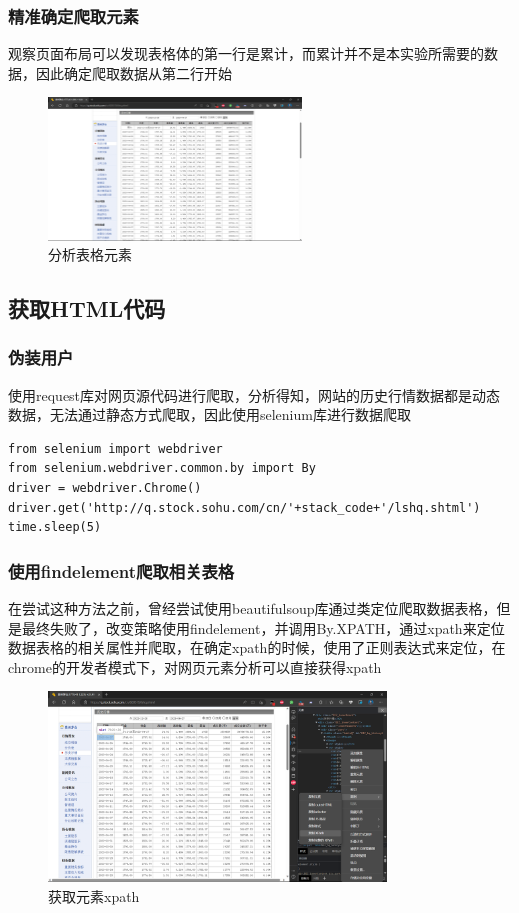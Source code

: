\documentclass[UTF8,12pt]{article}
\begin{document}
\newpage

\subsubsection{精准确定爬取元素}
观察页面布局可以发现表格体的第一行是累计，而累计并不是本实验所需要的数据，因此确定爬取数据从第二行开始

\begin{figure}[htbp]
    \centering
    \includegraphics[width=0.6\textwidth]{img/6.png}
    \caption{分析表格元素}
\end{figure}

\subsection{获取HTML代码}
\subsubsection{伪装用户}
使用request库对网页源代码进行爬取，分析得知，网站的历史行情数据都是动态数据，无法通过静态方式爬取，因此使用selenium库进行数据爬取

\begin{lstlisting}[title=调用selenium库, frame=shadowbox]
from selenium import webdriver
from selenium.webdriver.common.by import By
driver = webdriver.Chrome()
driver.get('http://q.stock.sohu.com/cn/'+stack_code+'/lshq.shtml')
time.sleep(5)
\end{lstlisting}

\subsubsection{使用findelement爬取相关表格}
在尝试这种方法之前，曾经尝试使用beautifulsoup库通过类定位爬取数据表格，但是最终失败了，改变策略使用findelement，并调用By.XPATH，通过xpath来定位数据表格的相关属性并爬取，在确定xpath的时候，使用了正则表达式来定位，在chrome的开发者模式下，对网页元素分析可以直接获得xpath
\begin{figure}[htbp]
    \centering
    \includegraphics[width=0.8\textwidth]{img/7.png}
    \caption{获取元素xpath}
\end{figure}
\end{document}
